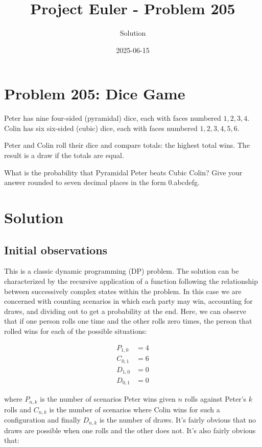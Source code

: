 \documentclass{article}
\title{Project Euler - Problem 205}
\author{Solution}
\date{2025-06-15}
\begin{document}
\maketitle

\section*{Problem 205: Dice Game}


Peter has nine four-sided (pyramidal) dice, each with faces numbered $1, 2, 3, 4$.
Colin has six six-sided (cubic) dice, each with faces numbered $1, 2, 3, 4, 5, 6$.

\par
Peter and Colin roll their dice and compare totals: the highest total wins. The result is a draw if the totals are equal.

\par
What is the probability that Pyramidal Peter beats Cubic Colin? Give your answer rounded to seven decimal places in the form 0.abcdefg.

\par


\section*{Solution}

\subsection*{Initial observations}

This is a classic dynamic programming (DP) problem.  The solution can be characterized by the recursive application of a function following the relationship between successively complex states within the problem.  In this case we are concerned with counting scenarios in which each party may win, accounting for draws, and dividing out to get a probability at the end.  Here, we can observe that if one person rolls one time and the other rolls zero times, the person that rolled wins for each of the possible situations:

\begin{align*}
    P_{1,0} &= 4 \\
    C_{0,1} &= 6 \\
    D_{1,0} &= 0 \\
    D_{0,1} &= 0
\end{align*}

where $P_{n,k}$ is the number of scenarios Peter wins given $n$ rolls against Peter's $k$ rolls and $C_{n,k}$ is the number of scenarios where Colin wins for such a configuration and finally $D_{n,k}$ is the number of draws.  It's fairly obvious that no draws are possible when one rolls and the other does not.  It's also fairly obvious that:
\end{document}
